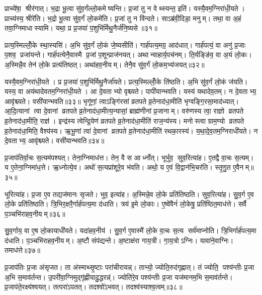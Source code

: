 प्राच्ये॑षा॒ श्रीर॑गात्। भ॒द्रा भू॒त्वा सु॑व॒र्गंल्लो॒कमेष्यन्ति। प्र॒जां तु न वेथ्स्यन्त॒ इति॑। यस्यै॒वम॒ग्निरा॑धी॒यते। प्राच्य॑स्य॒ श्रीरे॑ति। भ॒द्रो भू॒त्वा सु॑व॒र्गं लो॒कमे॑ति। प्र॒जां तु न वि॑न्दते। साऽब्र॑वी॒दिडा॒ मनुम्। तथा॒ वा अ॒हं तवा॒ग्निमाधास्यामि। यथा॒ प्र प्र॒जया॑ प॒शुभि॑र्मिथु॒नैर्ज॑नि॒ष्यसे॥३१॥

प्रत्य॒स्मिल्लोँ॒के स्था॒स्यसि॑। अ॒भि सु॑व॒र्गं लो॒कं जे॒ष्यसीति॑। गार्\mbox{}ह॑पत्य॒मग्र॒ आद॑धात्। गार्\mbox{}ह॑पत्यं॒ वा अनु॑ प्र॒जाः प॒शव॒ प्रजा॑यन्ते। गार्\mbox{}ह॑पत्येनै॒वास्मै प्र॒जां प॒शून्प्राज॑नयत्। अथान्वाहार्य॒पच॑नम्। ति॒र्यङ्ङि॑व॒ वा अ॒यं लो॒कः। अ॒स्मिन्नै॒व तेन॑ लो॒के प्रत्य॑तिष्ठत्। अथा॑हव॒नीयम्। तेनै॒व सु॑व॒र्गं लो॒कम॒भ्य॑जयत्॥३२॥

यस्यै॒वम॒ग्निरा॑धी॒यते। प्र प्र॒जया॑ प॒शुभि॑र्मिथु॒नैर्जा॑यते। प्रत्य॒स्मिल्लोँ॒के ति॑ष्ठति। अ॒भि सु॑व॒र्गं लो॒कं ज॑यति। यस्य॒ वा अय॑थादेवतम॒ग्निरा॑धी॒यते। आ दे॒वताभ्यो वृश्च्यते। पापी॑यान्भवति। यस्य॑ यथादेव॒तम्। न दे॒वताभ्य॒ आवृ॑श्च्यते। वसी॑यान्भवति॥३३॥ भृगू॑णां॒ त्वाऽङ्गि॑रसां व्रतपते व्र॒तेनाद॑धा॒मीति॑ भृग्वङ्गि॒रसा॒माद॑ध्यात्। आ॒दि॒त्यानां त्वा दे॒वानां व्रतपते व्र॒तेनाद॑धा॒मीत्य॒न्यासां॒ ब्राह्म॑णीनां प्र॒जानाम्। वरु॑णस्य त्वा॒ राज्ञो व्रतपते व्र॒तेनाद॑धा॒मीति॒ राज्ञ॑। इन्द्र॑स्य त्वेन्द्रि॒येण॑ व्रतपते व्र॒तेनाद॑धा॒मीति॑ राज॒न्य॑स्य। मनोस्त्वा ग्राम॒ण्यो व्रतपते व्र॒तेनाद॑धा॒मिति॒ वैश्य॑स्य। ऋ॒भू॒णां त्वा॑ दे॒वानां व्रतपते व्र॒तेनाद॑धा॒मीति॑ रथका॒रस्य॑। य॒था॒दे॒व॒तम॒ग्निराधी॑यते। न दे॒वताभ्य॒ आवृ॑श्च्यते। वसी॑यान्भवति॥३४॥

प्र॒जाप॑तिर्वा॒चः स॒त्यम॑पश्यत्। तेना॒ग्निमाध॑त्त। तेन॒ वै स आर्ध्नोत्। भूर्भुव॒ सुव॒रित्या॑ह। ए॒तद्वै वा॒चः स॒त्यम्। य ए॒तेना॒ग्निमा॑ध॒त्ते। ऋ॒ध्नोत्ये॒व। अथो॑ स॒त्यप्रा॑शूरे॒व भ॑वति। अथो॒ य ए॒वं वि॒द्वान॑भि॒चर॑ति। स्तृ॒णु॒त ए॒वैनम्॥३५॥

भूरित्या॑ह। प्र॒जा ए॒व तद्यज॑मानः सृजते। भुव॒ इत्या॑ह। अ॒स्मिन्ने॒व लो॒के प्रति॑तिष्ठति। सुव॒रित्या॑ह। सु॒व॒र्ग ए॒व लो॒के प्रति॑तिष्ठति। त्रि॒भिर॒क्षरै॒र्गार्\mbox{}ह॑पत्य॒मा द॑धाति। त्रय॑ इ॒मे लो॒काः। ए॒ष्वे॑वैनं॑ लो॒केषु॒ प्रति॑ष्ठित॒माध॑त्ते। सर्वै प॒ञ्चभि॑राहव॒नीयम्॥३६॥

सु॒व॒र्गाय॒ वा ए॒ष लो॒कायाधी॑यते। यदा॑हव॒नीय॑। सु॒व॒र्ग ए॒वास्मै॑ लो॒के वा॒चः स॒त्य सर्व॑माप्नोति। त्रि॒भिर्गार्\mbox{}ह॑पत्य॒मा द॑धाति। प॒ञ्चभि॑राहव॒नीयम्। अ॒ष्टौ संप॑द्यन्ते। अ॒ष्टाक्ष॑रा गाय॒त्री। गा॒य॒त्रोऽग्निः। यावा॑ने॒वाग्निः। तमाध॑त्ते॥३७॥

प्र॒जाप॑तिः प्र॒जा अ॑सृजत। ता अ॑स्माथ्सृ॒ष्टाः परा॑चीरायन्न्। ताभ्यो॒ ज्योति॒रुद॑गृह्णात्। तं ज्योति॒ पश्य॑न्तीः प्र॒जा अ॒भि स॒माव॑र्तन्त। उ॒परी॑वा॒ग्निमुद्गृ॑ह्णीयादु॒द्धरन्न्॑। ज्योति॑रे॒व पश्य॑न्तीः प्र॒जा यज॑मानम॒भि स॒माव॑र्तन्ते। प्र॒जाप॑ते॒रक्ष्य॑श्वयत्। तत्परा॑ऽपतत्। तदश्वो॑ऽभवत्। तदश्व॑स्याश्व॒त्वम्॥३८॥

